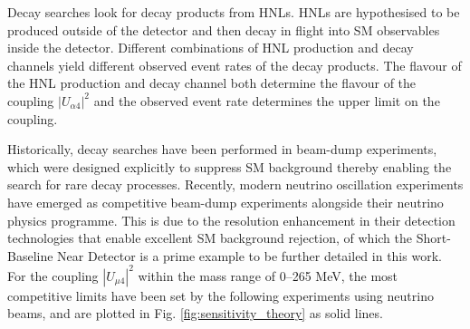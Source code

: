 Decay searches look for decay products from HNLs.
HNLs are hypothesised to be produced outside of the detector and then decay in flight into SM observables inside the detector.
Different combinations of HNL production and decay channels yield different observed event rates of the decay products.
The flavour of the HNL production and decay channel both determine the flavour of the coupling $|U_{\alpha4}|^2$ and the observed event rate determines the upper limit on the coupling.  

Historically, decay searches have been performed in beam-dump experiments, which were designed explicitly to suppress SM background thereby enabling the search for rare decay processes.
Recently, modern neutrino oscillation experiments have emerged as competitive beam-dump experiments alongside their neutrino physics programme.
This is due to the resolution enhancement in their detection technologies that enable excellent SM background rejection, of which the Short-Baseline Near Detector is a prime example to be further detailed in this work. 
For the coupling $|U_{\mu4}|^{2}$ within the mass range of 0--265 MeV, the most competitive limits have been set by the following experiments using neutrino beams, and are plotted in Fig. \ref{fig:sensitivity_theory} as solid lines.


